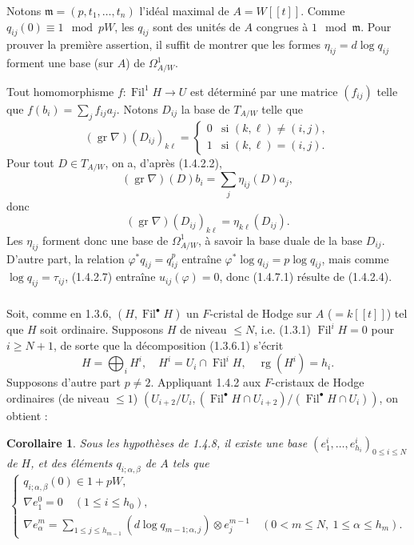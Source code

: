 \documentclass[12pt,a4paper]{article}
\theoremstyle{plain}
\newtheorem{corollary}[theorem]{Corollaire}
\theoremstyle{definition}
\theoremstyle{remark}
\DeclareMathOperator{\Fil}{Fil}
\DeclareMathOperator{\gr}{gr}
\DeclareMathOperator{\rg}{rg}
\newcommand{\mf}{\mathfrak{m}}
\begin{document}
Notons $\mf = (p, t_1, \ldots, t_n)$ l'id\'eal maximal de $A = W[[t]]$. Comme $q_{ij}(0) \equiv 1 \mod pW$, les $q_{ij}$ sont des unit\'es de $A$ congrues \`a $1 \mod \mf$. Pour prouver la premi\`ere assertion, il suffit de montrer que les formes $\eta_{ij} = d\log q_{ij}$ forment une base (sur $A$) de $\Omega^1_{A/W}$.

Tout homomorphisme $f : \Fil^1 H \to U$ est d\'etermin\'e par une matrice $(f_{ij})$ telle que $f(b_i) = \sum_j f_{ij}a_j$. Notons $D_{ij}$ la base de $T_{A/W}$ telle que
\[
(\gr\nabla)(D_{ij})_{k\ell} =
\begin{cases}
0 & \text{si } (k,\ell) \neq (i,j), \\
1 & \text{si } (k,\ell) = (i,j).
\end{cases}
\]
Pour tout $D \in T_{A/W}$, on a, d'apr\`es (1.4.2.2),
\[
(\gr\nabla)(D)b_i = \sum_j \eta_{ij}(D)a_j,
\]
donc
\[
(\gr\nabla)(D_{ij})_{k\ell} = \eta_{k\ell}(D_{ij}).
\]
Les $\eta_{ij}$ forment donc une base de $\Omega^1_{A/W}$, \`a savoir la base duale de la base $D_{ij}$. D'autre part, la relation $\varphi^*q_{ij} = q_{ij}^p$ entra\^ine $\varphi^*\log q_{ij} = p\log q_{ij}$, mais comme $\log q_{ij} = \tau_{ij}$, (1.4.2.7) entra\^ine $u_{ij}(\varphi) = 0$, donc (1.4.7.1) r\'esulte de (1.4.2.4).

\subsubsection{}
Soit, comme en 1.3.6, $(H, \Fil^\bullet H)$ un $F$-cristal de Hodge sur $A$ ($= k[[t]]$) tel que $H$ soit ordinaire. Supposons $H$ de niveau $\leqslant N$, i.e. (1.3.1) $\Fil^i H = 0$ pour $i \geqslant N+1$, de sorte que la d\'ecomposition (1.3.6.1) s'\'ecrit
\begin{equation}\tag{1.4.8.1}
H = \bigoplus_i H^i, \quad H^i = U_i \cap \Fil^i H, \quad \rg(H^i) = h_i. 
\end{equation}
Supposons d'autre part $p \neq 2$. Appliquant 1.4.2 aux $F$-cristaux de Hodge ordinaires (de niveau $\leqslant 1$) $(U_{i+2}/U_i, (\Fil^\bullet H \cap U_{i+2})/(\Fil^\bullet H \cap U_i))$, on obtient :

\begin{corollary}\label{cor:1.4.9}
Sous les hypoth\`eses de 1.4.8, il existe une base $(e^i_1, \ldots, e^i_{h_i})_{0 \leqslant i \leqslant N}$ de $H$, et des \'el\'ements $q_{i;\alpha,\beta}$ de $A$ tels que
\begin{equation}\tag{1.4.9.1}
\begin{cases}
q_{i;\alpha,\beta}(0) \in 1 + pW, \\[1ex]
\nabla e^0_1 = 0 \quad (1 \leqslant i \leqslant h_0), \\[1ex]
\displaystyle\nabla e^m_\alpha = \sum_{1 \leqslant j \leqslant h_{m-1}} (d\log q_{m-1;\alpha,j}) \otimes e^{m-1}_j \quad (0 < m \leqslant N, \ 1 \leqslant \alpha \leqslant h_m).
\end{cases} 
\end{equation}
\end{corollary}
\end{document}
